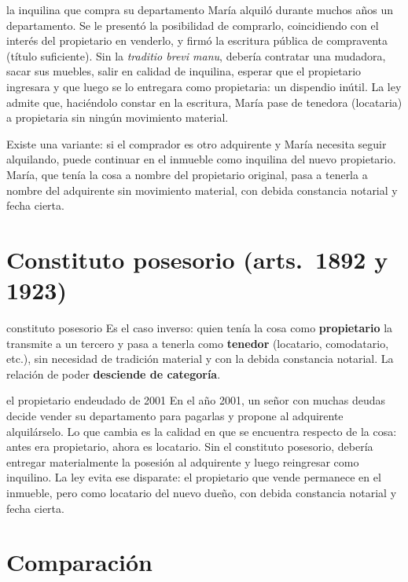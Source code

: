 \documentclass[12pt,oneside]{book}
\begin{document}
\begin{ejemplo}{la inquilina que compra su departamento}
María alquiló durante muchos años un departamento. Se le presentó la posibilidad de comprarlo, coincidiendo con el interés del propietario en venderlo, y firmó la escritura pública de compraventa (título suficiente). Sin la \textit{traditio brevi manu}, debería contratar una mudadora, sacar sus muebles, salir en calidad de inquilina, esperar que el propietario ingresara y que luego se lo entregara como propietaria: un dispendio inútil. La ley admite que, haciéndolo constar en la escritura, María pase de tenedora (locataria) a propietaria sin ningún movimiento material.
\end{ejemplo}

Existe una variante: si el comprador es otro adquirente y María necesita seguir alquilando, puede continuar en el inmueble como inquilina del nuevo propietario. María, que tenía la cosa a nombre del propietario original, pasa a tenerla a nombre del adquirente sin movimiento material, con debida constancia notarial y fecha cierta.

\section{Constituto posesorio (arts.~1892 y 1923)}

\begin{definicion}{constituto posesorio}
Es el caso inverso: quien tenía la cosa como \textbf{propietario} la transmite a un tercero y pasa a tenerla como \textbf{tenedor} (locatario, comodatario, etc.), sin necesidad de tradición material y con la debida constancia notarial. La relación de poder \textbf{desciende de categoría}.
\end{definicion}

\begin{ejemplo}{el propietario endeudado de 2001}
En el año 2001, un señor con muchas deudas decide vender su departamento para pagarlas y propone al adquirente alquilárselo. Lo que cambia es la calidad en que se encuentra respecto de la cosa: antes era propietario, ahora es locatario. Sin el constituto posesorio, debería entregar materialmente la posesión al adquirente y luego reingresar como inquilino. La ley evita ese disparate: el propietario que vende permanece en el inmueble, pero como locatario del nuevo dueño, con debida constancia notarial y fecha cierta.
\end{ejemplo}

\section{Comparación}
\end{document}
